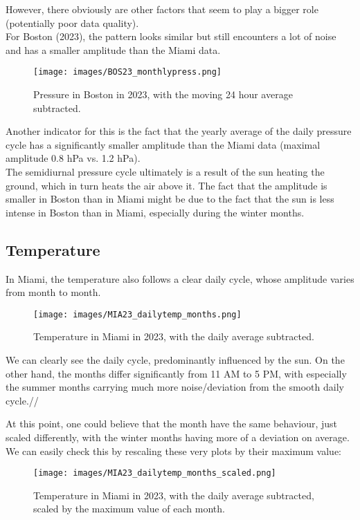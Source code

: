 \documentclass[12pt, parskip=half]{scrartcl}
\begin{document}
However, there obviously are other factors that seem to play a bigger role (potentially poor data quality).\\

For Boston (2023), the pattern looks similar but still encounters a lot of noise and has a smaller amplitude than the Miami data.
\begin{figure}[!h]
\centering
\texttt{[image: images/BOS23\_monthlypress.png]}
\caption{Pressure in Boston in 2023, with the moving 24 hour average subtracted.}
\end{figure}

Another indicator for this is the fact that the yearly average of the daily pressure cycle has a significantly smaller amplitude than the Miami data (maximal amplitude 0.8 hPa vs. 1.2 hPa).\\
The semidiurnal pressure cycle ultimately is a result of the sun heating the ground, which in turn heats the air above it.
The fact that the amplitude is smaller in Boston than in Miami might be due to the fact that the sun is less intense in Boston than in Miami, especially during the winter months.


\subsection{Temperature}
In Miami, the temperature also follows a clear daily cycle, whose amplitude varies from month to month.

\begin{figure}[!h]
\centering
\texttt{[image: images/MIA23\_dailytemp\_months.png]}
\caption{Temperature in Miami in 2023, with the daily average subtracted.}
\end{figure}

We can clearly see the daily cycle, predominantly influenced by the sun.
On the other hand, the months differ significantly from 11 AM to 5 PM, with especially the summer months carrying much more noise/deviation from the smooth daily cycle.//

At this point, one could believe that the month have the same behaviour, just scaled differently, with the winter months having more of a deviation on average.
We can easily check this by rescaling these very plots by their maximum value:

\begin{figure}[!h]
\label{fig:mia23_dailytemp_months_scaled}
\centering
\texttt{[image: images/MIA23\_dailytemp\_months\_scaled.png]}
\caption{Temperature in Miami in 2023, with the daily average subtracted, scaled by the maximum value of each month.}
\end{figure}
\end{document}
